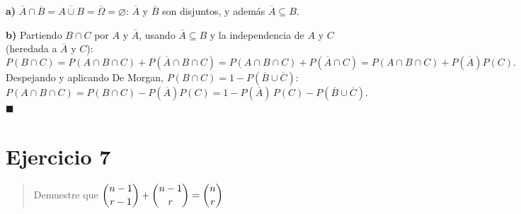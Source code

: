 \documentclass[11pt]{article}
\begin{document}
\begin{resp}
\textbf{a)} $\overline{A}\cap\overline{B}=\overline{A\cup B}=\overline{\Omega}=\varnothing$:
$\overline{A}$ y $\overline{B}$ son disjuntos, y además $\overline{A}\subseteq B$.

\textbf{b)} Partiendo $B\cap C$ por $A$ y $\overline{A}$, usando $\overline{A}\subseteq B$ y
la independencia de $A$ y $C$ (heredada a $\overline{A}$ y $C$):
\[
P(B\cap C)=P(A\cap B\cap C)+P(\overline{A}\cap B\cap C)
=P(A\cap B\cap C)+P(\overline{A}\cap C)
=P(A\cap B\cap C)+P(\overline{A})P(C).
\]
Despejando y aplicando De Morgan, $P(B\cap C)=1-P(\overline{B}\cup\overline{C})$:
\[
P(A\cap B\cap C)=P(B\cap C)-P(\overline{A})P(C)
=1-P(\overline{A})\,P(C)-P(\overline{B}\cup\overline{C}).
\]
$\blacksquare$
\end{resp}

\section*{Ejercicio 7}

\begin{quote}
Demuestre que $\dbinom{n-1}{r-1}+\dbinom{n-1}{r}=\dbinom{n}{r}$
\end{quote}
\end{document}
